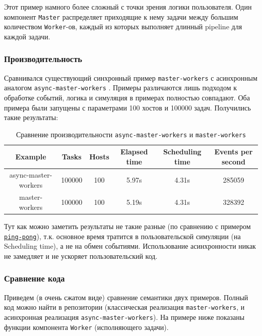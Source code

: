 Этот пример намного более сложный с точки зрения логики пользователя. Один компонент \texttt{Master} распределяет приходящие к нему задачи между большим количеством \texttt{Worker}-ов, каждый из которых выполняет длинный pipeline для каждой задачи. 

\subsubsection{Производительность}

Сравнивался существующий синхронный пример \texttt{master-workers} \cite{master-workers-example} с асинхронным аналогом \texttt{async-master-workers} \cite{async-master-workers-example}. Примеры различаются лишь подходом к обработке событий, логика и симуляция в примерах полностью совпадают. Оба примера были запущены с параметрами 100 хостов и 100000 задач. Получились такие результаты:

\begin{table}[H]
    \centering
    \begin{tabular}{|c|c|c|c|c|c|}
        \hline
        Example & Tasks & Hosts & Elapsed time & Scheduling time & Events per second \\
        \hline
        async-master-workers & 100000 & 100 & 5.97s & 4.31s & 285059 \\
        \hline
        master-workers & 100000 & 100 & 5.19s & 4.31s & 328392 \\
        \hline
    \end{tabular}
    \caption{Сравнение производительности \texttt{async-master-workers} и \texttt{master-workers}}
    \label{cmp:master-workers}
\end{table}

Тут как можно заметить результаты не такие разные (по сравнению с примером \hyperref[cmp:ping-pong]{\texttt{ping-pong}}), т.к. основное время тратится в пользовательской симуляции (на Scheduling time), а не на обмен событиями. Использование асинхронности никак не замедляет и не ускоряет пользовательский код. 


\subsubsection{Сравнение кода}

Приведем (в очень сжатом виде) сравнение семантики двух примеров. Полный код можно найти в репозитории (классическая реализация \texttt{master-workers}\cite{master-workers-example}, и асинхронная реализация \texttt{async-master-workers}\cite{async-master-workers-example}). На примере ниже показаны функции компонента \texttt{Worker} (исполняющего задачи).

